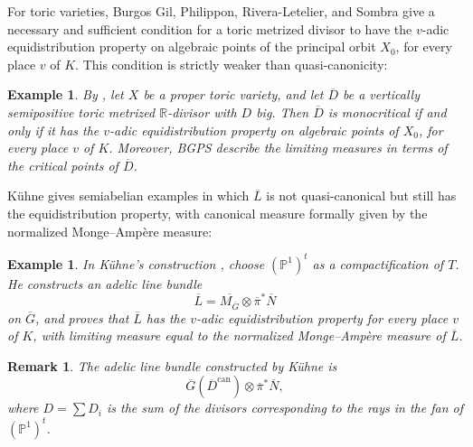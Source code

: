 \documentclass[10pt,a4paper]{amsart}
\theoremstyle{plain}
\newtheorem{example}[theorem]{Example}
\newtheorem{remark}[theorem]{Remark}
\theoremstyle{plain}
\numberwithin{equation}{section}
\begin{document}
For toric varieties, Burgos Gil, Philippon, Rivera-Letelier, and Sombra give a
necessary and sufficient condition for a toric metrized
divisor to have the \(v\)-adic equidistribution property on algebraic points of
the principal orbit \(X_0\), for every place \(v\) of \(K\).  This condition is
strictly weaker than quasi-canonicity:
\begin{example}
	By \cite{BGPS19}, let \(X\) be a proper toric variety, and let \(\overline D\) be a
	vertically semipositive toric metrized \(\mathbb R\)-divisor with \(D\)
	big.  Then \(\overline D\) is monocritical if and only if it has the
	\(v\)-adic equidistribution property on algebraic points of \(X_0\), for
	every place \(v\) of \(K\).  Moreover, BGPS describe the limiting measures
	in terms of the critical points of \(\overline D\).
\end{example}
K\"uhne gives semiabelian examples in which \(\overline L\) is not
quasi-canonical but still has the equidistribution property, with canonical
measure formally given by the normalized Monge--Amp\`ere measure:
\begin{example}
	In K\"uhne's construction \cite{Ku1}, choose \((\mathbb P^1)^t\) as a
	compactification of \(T\).  He
	constructs an adelic line bundle
	\[
	\overline L=\overline{M_{\overline G}}\otimes\overline\pi^*\overline N
	\]
	on \(\overline G\), and proves that \(\overline L\) has the \(v\)-adic
	equidistribution property for every place \(v\) of \(K\), with limiting
	measure equal to the normalized Monge--Amp\`ere measure of \(\overline L\).
\end{example}	
\begin{remark}
	The adelic line bundle constructed by K\"uhne is
	\[
	\overline{G}(\overline{D}^{\mathrm{can}})
	\otimes\overline{\pi}^*\overline{N},
	\]
	where \(D=\sum D_i\) is the sum of the divisors corresponding to the rays
	in the fan of \((\mathbb P^1)^t\).
\end{remark}
\end{document}
